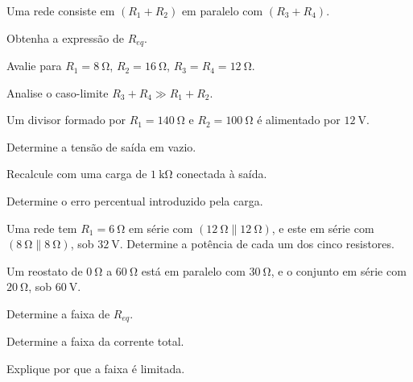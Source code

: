 \blocoaprofundamento
\begin{questao}[3]{}

Uma rede consiste em $(R_1+R_2)$ em paralelo com $(R_3+R_4)$.
\begin{itensq}
\item Obtenha a expressão de $R_{eq}$.
\item Avalie para $R_1=\SI{8}{\ohm}$, $R_2=\SI{16}{\ohm}$,
      $R_3=R_4=\SI{12}{\ohm}$.
\item Analise o caso-limite $R_3+R_4\gg R_1+R_2$.
\end{itensq}


\end{questao}
\begin{questao}[3]{}

Um divisor formado por $R_1=\SI{140}{\ohm}$ e $R_2=\SI{100}{\ohm}$ é alimentado
por $\SI{12}{\volt}$.
\begin{itensq}
\item Determine a tensão de saída em vazio.
\item Recalcule com uma carga de $\SI{1}{\kilo\ohm}$ conectada à saída.
\item Determine o erro percentual introduzido pela carga.
\end{itensq}


\end{questao}
\begin{questao}[3]{}

Uma rede tem $R_1=\SI{6}{\ohm}$ em série com $(\SI{12}{\ohm}\parallel
\SI{12}{\ohm})$, e este em série com $(\SI{8}{\ohm}\parallel\SI{8}{\ohm})$, sob
$\SI{32}{\volt}$. Determine a potência de cada um dos cinco resistores.


\end{questao}
\begin{questao}[3]{}

Um reostato de $\SI{0}{\ohm}$ a $\SI{60}{\ohm}$ está em paralelo com
$\SI{30}{\ohm}$, e o conjunto em série com $\SI{20}{\ohm}$, sob
$\SI{60}{\volt}$.
\begin{itensq}
\item Determine a faixa de $R_{eq}$.
\item Determine a faixa da corrente total.
\item Explique por que a faixa é limitada.
\end{itensq}


\end{questao}
